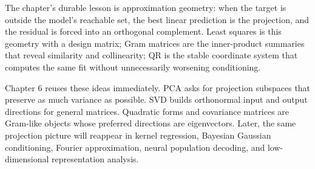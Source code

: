 The chapter's durable lesson is approximation geometry: when the target is outside the model's reachable set, the best linear prediction is the projection, and the residual is forced into an orthogonal complement. Least squares is this geometry with a design matrix; Gram matrices are the inner-product summaries that reveal similarity and collinearity; QR is the stable coordinate system that computes the same fit without unnecessarily worsening conditioning.

Chapter 6 reuses these ideas immediately. PCA asks for projection subspaces that preserve as much variance as possible. SVD builds orthonormal input and output directions for general matrices. Quadratic forms and covariance matrices are Gram-like objects whose preferred directions are eigenvectors. Later, the same projection picture will reappear in kernel regression, Bayesian Gaussian conditioning, Fourier approximation, neural population decoding, and low-dimensional representation analysis.

\clearpage
